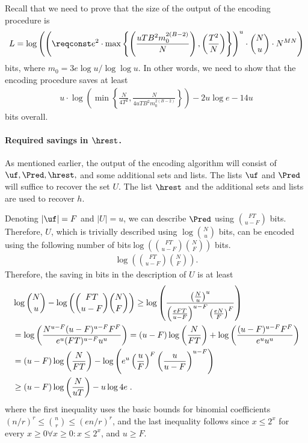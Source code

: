 Recall that we need to prove that the size of the output of the encoding procedure is \[L=\log \left({\left(\reqconst e^2\cdot \max\left\{\left(\frac{uTB^2m_0^{2(B-2)}}{N}\right),\left(\frac{T^2}{N}\right)\right\}\right)}^u \cdot \binom {N}{u}\cdot N^{MN}\right)\] bits, where $m_0 = 3e \log u / \log\log u$.
In other words, we need to show that the encoding procedure saves at least 
\begin{align}
  u\cdot\log\left( \min\left\{\frac{N}{4T^2},\frac{N}{4uTB^2m_0^{2(B-2)}}\right\}\right) -2u\log e -14u
  \label{eq:requiredSavings}
\end{align}
bits overall.

\paragraph{Required savings in $\hrest$.} As mentioned earlier, the output of the encoding algorithm will consist of $\uf,\Pred, \hrest,$ and some additional sets and lists. The lists $\uf$ and $\Pred$ will suffice to recover the set $U$. The list $\hrest$ and the additional sets and lists are used to recover $h$. 

Denoting $|\uf|=F$ and $|U|=u$, we can describe $\Pred$ using $\binom{FT}{u-F}$ bits. Therefore, $U$, which is trivially described using $\log \binom{N}{u}$ bits, can be encoded using \ifnum{} the following number of bits\else $\log \left(\binom{FT}{u-F}\binom{N}{F}\right)$ bits.\fi
\ifnum{}
\begin{align*}
\log \left(\binom{FT}{u-F}\binom{N}{F}\right).
\end{align*}  
\fi
 Therefore, the saving in bits in the description of $U$ is at least
\begin{align}
&\log \binom{N}{u} - \log \left(\binom{FT}{u-F}\binom{N}{F}\right)  \ge \log \left(\frac{\left(\frac{N}{u}\right)^u}{\left(\frac{eFT}{u-F}\right)^{u-F}\left(\frac{eN}{F}\right)^F} \right) \nonumber \\
\ifnum\eprintversion=1
 & =  \log \left(\frac{N^{u-F}(u-F)^{u-F}F^F}{e^u (FT)^{u-F}u^u}\right)= (u-F)\log \left(\frac{N}{FT}\right)+\log \left(  \frac{(u-F)^{u-F}F^F}{e^u u^u} \right)\nonumber \\
 \fi
 & = (u-F)\log \left(\frac{N}{FT}\right)-\log \left(e^u \left(\frac{u}{F}\right)^F\left(\frac{u}{u-F}\right)^{u-F}\right) \nonumber \\
 &  \geq (u-F)\log \left(\frac{N}{uT}\right)-u\log 4e\;. \label{eq:savingU}
\end{align}
where the first inequality uses the basic bounds for binomial coefficients $(n/r)^r\leq \binom{n}{r}\leq (en/r)^r$, and the last inequality follows since  \ifnum{} $x \le 2^x$ for every $x\ge 0$\else $\forall x\ge 0\colon x \le 2^x$\fi, and $u\geq F$.

